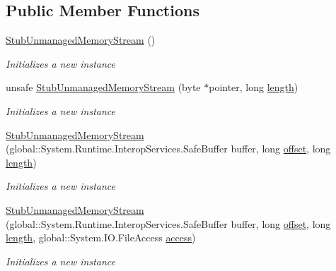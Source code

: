 \subsection*{Public Member Functions}
\begin{DoxyCompactItemize}
\item 
\hyperlink{class_system_1_1_i_o_1_1_fakes_1_1_stub_unmanaged_memory_stream_a0fbd4e695aa60751f0159c6660e70abc}{Stub\-Unmanaged\-Memory\-Stream} ()
\begin{DoxyCompactList}\small\item\em Initializes a new instance\end{DoxyCompactList}\item 
unsafe \hyperlink{class_system_1_1_i_o_1_1_fakes_1_1_stub_unmanaged_memory_stream_ab2f04ee4bf9a8d23cd7882a74881b928}{Stub\-Unmanaged\-Memory\-Stream} (byte $\ast$pointer, long \hyperlink{jquery-1_810_82-vsdoc_8js_aa7de35d58da66d9944ab9cbe82c19640}{length})
\begin{DoxyCompactList}\small\item\em Initializes a new instance\end{DoxyCompactList}\item 
\hyperlink{class_system_1_1_i_o_1_1_fakes_1_1_stub_unmanaged_memory_stream_a462a18a7319d5c552517eb5c3ffa9869}{Stub\-Unmanaged\-Memory\-Stream} (global\-::\-System.\-Runtime.\-Interop\-Services.\-Safe\-Buffer buffer, long \hyperlink{jquery-1_810_82_8js_a4a9f594d20d927164551fc7fa4751a2f}{offset}, long \hyperlink{jquery-1_810_82-vsdoc_8js_aa7de35d58da66d9944ab9cbe82c19640}{length})
\begin{DoxyCompactList}\small\item\em Initializes a new instance\end{DoxyCompactList}\item 
\hyperlink{class_system_1_1_i_o_1_1_fakes_1_1_stub_unmanaged_memory_stream_a47ec528fa2a94346daaa7e9d1d1cecfe}{Stub\-Unmanaged\-Memory\-Stream} (global\-::\-System.\-Runtime.\-Interop\-Services.\-Safe\-Buffer buffer, long \hyperlink{jquery-1_810_82_8js_a4a9f594d20d927164551fc7fa4751a2f}{offset}, long \hyperlink{jquery-1_810_82-vsdoc_8js_aa7de35d58da66d9944ab9cbe82c19640}{length}, global\-::\-System.\-I\-O.\-File\-Access \hyperlink{jquery-1_810_82-vsdoc_8js_a130ad18d21e14ee566dbf4eb185f2bda}{access})
\begin{DoxyCompactList}\small\item\em Initializes a new instance\end{DoxyCompactList}\item 

\end{DoxyCompactItemize}
